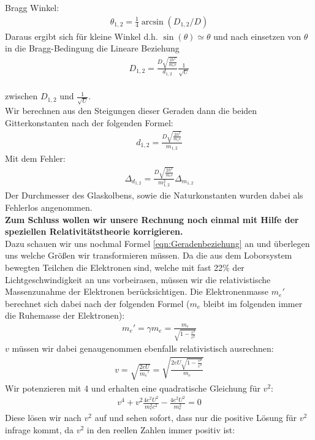 \documentclass[12pt,a4paper]{article}
\begin{document}
Bragg Winkel:
\begin{align}
\theta_{1,2} = \frac{1}{4}\arcsin(D_{1,2}/D)
\end{align}
Daraus ergibt sich für kleine Winkel d.h. $\sin(\theta) \simeq \theta$ und nach einsetzen von $\theta$ in die Bragg-Bedingung die Lineare Beziehung
\begin{align}
D_{1,2} = \frac{D\sqrt{\frac{2h^2}{m_ee}}}{d_{1,2}}\frac{1}{\sqrt{U}}
\label{eqn:Geradenbeziehung}
\end{align}\\
zwischen $D_{1,2}$ und $\frac{1}{\sqrt{U}}$.\\
Wir berechnen aus den Steigungen dieser Geraden dann die beiden Gitterkonstanten nach der folgenden Formel:
\begin{align}
d_{1,2} = \frac{D\sqrt{\frac{2h^2}{m_ee}}}{m_{1,2}}
\label{eqn:_Gitterkonstante_aus_Steigung}
\end{align}
Mit dem Fehler:
\begin{align}
\Delta_{d_{1,2}} = \frac{D\sqrt{\frac{2h^2}{m_ee}}}{m_{1,2}^2}\Delta_{m_{1,2}}
\end{align}
Der Durchmesser des Glaskolbens, sowie die Naturkonstanten wurden dabei als Fehlerlos angenommen.\\
\textbf{Zum Schluss wollen wir unsere Rechnung noch einmal mit Hilfe der speziellen Relativitätstheorie korrigieren.}\\
Dazu schauen wir uns nochmal Formel \ref{eqn:Geradenbeziehung} an und überlegen uns welche Größen wir transformieren müssen. Da die aus dem Loborsystem bewegten Teilchen die Elektronen sind, welche mit fast 22\% der Lichtgeschwindigkeit an uns vorbeirasen, müssen wir die relativistische Massenzunahme der Elektronen berücksichtigen.
Die Elektronenmasse $m_e'$ berechnet sich dabei nach der folgenden Formel ($m_e$ bleibt im folgenden immer die Ruhemasse der Elektronen):
\begin{align}
m_e' = \gamma m_e = \frac{m_e}{\sqrt{1-\frac{v^2}{c^2}}}
\end{align}
$v$ müssen wir dabei genaugenommen ebenfalls relativistisch ausrechnen:
\begin{align}
v = \sqrt{\frac{2eU}{m_e'}} = \sqrt{\frac{2eU\sqrt{1-\frac{v^2}{c^2}}}{m_e}}
\end{align}
Wir potenzieren mit 4 und erhalten eine quadratische Gleichung für $v^2$:
\begin{align}
v^4 + v^2\frac{4 e^2 U^2}{m_e^2 c^2} - \frac{4 e^2 U^2}{m_e^2} = 0
\end{align}
Diese lösen wir nach $v^2$ auf und sehen sofort, dass nur die positive Lösung für $v^2$ infrage kommt, da $v^2$ in den reellen Zahlen immer positiv ist:
\end{document}
